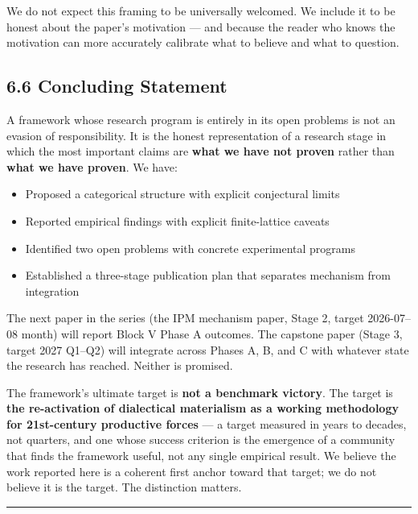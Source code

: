 \documentclass[
]{article}
\providecommand{\tightlist}{%
  \setlength{\itemsep}{0pt}\setlength{\parskip}{0pt}}
\begin{document}
We do not expect this framing to be universally welcomed. We include it
to be honest about the paper's motivation --- and because the reader who
knows the motivation can more accurately calibrate what to believe and
what to question.

\hypertarget{concluding-statement}{%
\subsection{6.6 Concluding Statement}\label{concluding-statement}}

A framework whose research program is entirely in its open problems is
not an evasion of responsibility. It is the honest representation of a
research stage in which the most important claims are \textbf{what we
have not proven} rather than \textbf{what we have proven}. We have:

\begin{itemize}
\tightlist
\item
  Proposed a categorical structure with explicit conjectural limits
\item
  Reported empirical findings with explicit finite-lattice caveats
\item
  Identified two open problems with concrete experimental programs
\item
  Established a three-stage publication plan that separates mechanism
  from integration
\end{itemize}

The next paper in the series (the IPM mechanism paper, Stage 2, target
2026-07--08 month) will report Block V Phase A outcomes. The capstone
paper (Stage 3, target 2027 Q1--Q2) will integrate across Phases A, B,
and C with whatever state the research has reached. Neither is promised.

The framework's ultimate target is \textbf{not a benchmark victory}. The
target is \textbf{the re-activation of dialectical materialism as a
working methodology for 21st-century productive forces} --- a target
measured in years to decades, not quarters, and one whose success
criterion is the emergence of a community that finds the framework
useful, not any single empirical result. We believe the work reported
here is a coherent first anchor toward that target; we do not believe it
is the target. The distinction matters.

\begin{center}\rule{0.5\linewidth}{0.5pt}\end{center}
\end{document}
